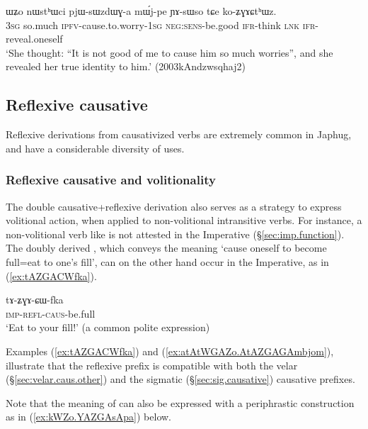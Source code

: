 \begin{exe}
\ex \label{ex:koZGACthWz}
\gll  ɯʑo nɯstʰɯci pjɯ-sɯzdɯɣ-a mɯ́j-pe ɲɤ-sɯso tɕe ko-ʑɣɤɕtʰɯz. \\
\textsc{3sg} so.much \textsc{ipfv}-cause.to.worry-\textsc{1sg} \textsc{neg}:\textsc{sens}-be.good \textsc{ifr}-think \textsc{lnk} \textsc{ifr}-reveal.oneself \\
\glt `She thought: ``It is not good of me to cause him so much worries'', and she revealed her true identity to him.' (2003kAndzwsqhaj2)
 \end{exe}
 
\subsection{Reflexive causative} \label{sec:refl.caus}
Reflexive derivations from causativized verbs are extremely common in Japhug, and have a considerable diversity of uses.

\subsubsection{Reflexive causative and volitionality}  \label{sec:refl.caus.volitional}
The double causative+reflexive derivation also serves as a strategy to express volitional action, when applied to non-volitional intransitive verbs. For instance, a non-volitional verb like  is not attested in the Imperative (§\ref{sec:imp.function}). The doubly derived , which conveys the meaning `cause oneself to become full=eat to one's fill', can on the other hand occur in the Imperative, as in (\ref{ex:tAZGACWfka}).

\begin{exe}
\ex \label{ex:tAZGACWfka}
\gll tɤ-ʑɣɤ-ɕɯ-fka \\
\textsc{imp}-\textsc{refl}-\textsc{caus}-be.full \\
\glt `Eat to your fill!' (a common polite expression)
 \end{exe}
 
Examples (\ref{ex:tAZGACWfka}) and (\ref{ex:atAtWGAZo.AtAZGAGAmbjom}), illustrate that the reflexive prefix is compatible with both the velar  (§\ref{sec:velar.caus.other}) and the sigmatic (§\ref{sec:sig.causative}) causative prefixes.  

 Note that the meaning of  can also be expressed with a periphrastic construction as in (\ref{ex:kWZo.YAZGAsApa}) below.
 
